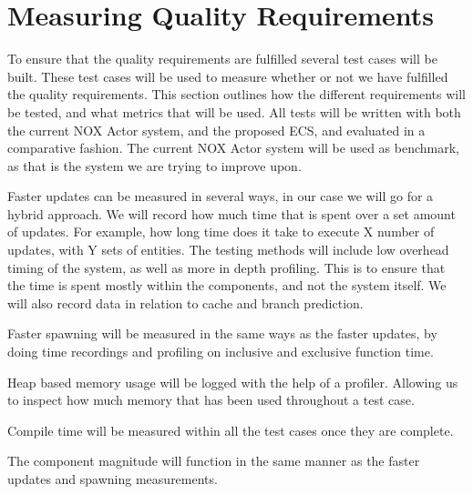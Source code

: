 \section{Measuring Quality Requirements}
To ensure that the quality requirements are fulfilled several test cases will be built. 
These test cases will be used to measure whether or not we have fulfilled the quality requirements.
This section outlines how the different requirements will be tested, and what metrics that will be used.
All tests will be written with both the current NOX Actor system, and the proposed ECS, and evaluated in a comparative fashion.
The current NOX Actor system will be used as benchmark, as that is the system we are trying to improve upon.

Faster updates can be measured in several ways, in our case we will go for a hybrid approach. 
We will record how much time that is spent over a set amount of updates. 
For example, how long time does it take to execute X number of updates, with Y sets of entities.
The testing methods will include low overhead timing of the system, as well as more in depth profiling.
This is to ensure that the time is spent mostly within the components, and not the system itself.
We will also record data in relation to cache and branch prediction.

Faster spawning will be measured in the same ways as the faster updates, 
by doing time recordings and profiling on inclusive and exclusive function time.

Heap based memory usage will be logged with the help of a profiler. Allowing us to inspect how much memory that has been used throughout a test case.

Compile time will be measured within all the test cases once they are complete.

The component magnitude will function in the same manner as the faster updates and spawning measurements. 
